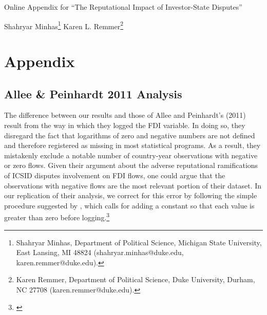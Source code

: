 \documentclass[12pt,onesided]{amsart}
\begin{document}
\thispagestyle{empty}

\begin{center}
{\sc \large Online Appendix for ``The Reputational Impact of Investor-State Disputes''}
\end{center}

\vspace{10mm}

\begin{center}
{\sc Shahryar Minhas}\footnote{Shahryar Minhas, Department of Political Science, Michigan State University, East Lansing, MI 48824 (shahryar.minhas@duke.edu, karen.remmer@duke.edu).}
{\sc Karen L. Remmer}\footnote{Karen Remmer, Department of Political Science, Duke University, Durham, NC 27708 (karen.remmer@duke.edu).}
\end{center}

\newpage

\setcounter{page}{1}
\doublespacing

\section*{Appendix}
\label{appendix}

\appendix
\setcounter{figure}{0} \renewcommand{\thefigure}{A.\arabic{figure}}
\setcounter{table}{0} \renewcommand{\thetable}{A.\arabic{table}}

\subsection*{Allee \& Peinhardt 2011 Analysis}

The difference between our results and those of Allee and Peinhardt's (2011) result from the way in which they logged the FDI variable. In doing so, they disregard the fact that logarithms of zero and negative numbers are not defined and therefore registered as missing in most statistical programs. As a result, they mistakenly exclude a notable number of country-year observations with negative or zero flows. Given their argument about the adverse reputational ramifications of ICSID disputes involvement on FDI flows, one could argue that the observations with negative flows are the most relevant portion of their dataset. In our replication of their analysis, we correct for this error by following the simple procedure suggested by \citeauthor{li:2009}, which calls for adding a constant so that each value is greater than zero before logging.\footnote{\citet{li:2009}} 
\end{document}
